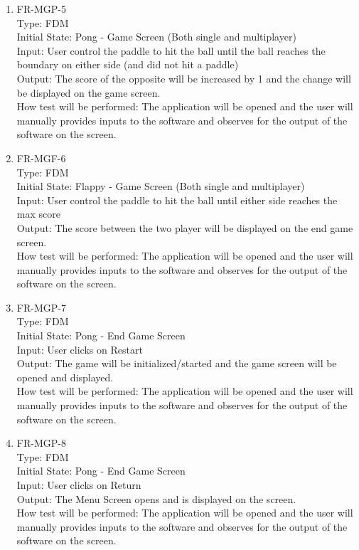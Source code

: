 \documentclass[12pt, titlepage]{article}
\begin{document}
\begin{enumerate}
\item{FR-MGP-5\\}
Type: FDM\\
Initial State: Pong - Game Screen (Both single and multiplayer)\\
Input: User control the paddle to hit the ball until the ball reaches the boundary on either side (and did not hit a paddle)\\
Output: The score of the opposite will be increased by 1 and the change will be displayed on the game screen.\\
How test will be performed: The application will be opened and the user will manually provides inputs to the software and observes for the output of the software on the screen.\\

\item{FR-MGF-6\\}
Type: FDM\\
Initial State: Flappy - Game Screen (Both single and multiplayer)\\
Input: User control the paddle to hit the ball until either side reaches the max score\\
Output: The score between the two player will be displayed on the end game screen.\\
How test will be performed: The application will be opened and the user will manually provides inputs to the software and observes for the output of the software on the screen.\\

\item{FR-MGP-7\\}
Type: FDM\\
Initial State: Pong - End Game Screen\\
Input: User clicks on Restart\\
Output: The game will be initialized/started and the game screen will be opened and displayed.\\
How test will be performed: The application will be opened and the user will manually provides inputs to the software and observes for the output of the software on the screen.\\

\item{FR-MGP-8\\}
Type: FDM\\
Initial State: Pong - End Game Screen\\
Input: User clicks on Return\\
Output: The Menu Screen opens and is displayed on the screen.\\
How test will be performed: The application will be opened and the user will manually provides inputs to the software and observes for the output of the software on the screen.\\
    
\end{enumerate}
\end{document}
